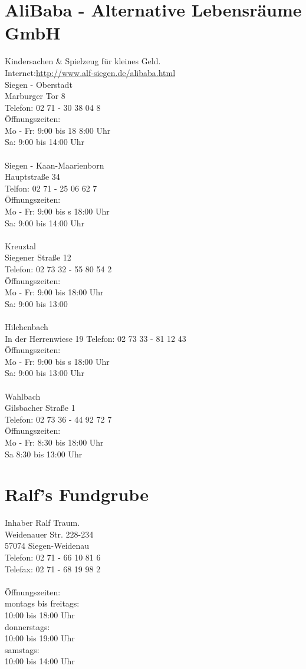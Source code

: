 \section{AliBaba - Alternative Lebensräume GmbH}
Kindersachen \& Spielzeug für kleines Geld.\\
Internet:\href{http://www.alf-siegen.de/alibaba.html}{http://www.alf-siegen.de/alibaba.html}
\\
Siegen - Oberstadt\\
Marburger Tor 8\\
Telefon: 02 71 - 30 38 04 8\\
Öffnungszeiten:\\
Mo - Fr: 9:00 bis 18 8:00 Uhr \\
Sa: 9:00 bis 14:00 Uhr\\ 
\\
Siegen - Kaan-Maarienborn\\
Hauptstraße 34\\
Telfon: 02 71 - 25 06 62 7\\ 
Öffnungszeiten:\\
Mo - Fr: 9:00 bis s 18:00 Uhr\\ 
Sa: 9:00 bis 14:00 Uhr\\
\\
Kreuztal \\ 
Siegener Straße 12\\  
Telefon: 02 73 32 - 55 80 54 2\\ 
Öffnungszeiten:\\
Mo - Fr: 9:00 bis 18:00 Uhr\\
Sa: 9:00 bis 13:00\\
\\
Hilchenbach\\
In der Herrenwiese 19 
Telefon: 02 73 33 - 81 12 43\\ 
Öffnungszeiten:\\
Mo - Fr: 9:00 bis s 18:00 Uhr\\
Sa: 9:00 bis 13:00 Uhr\\
\\
Wahlbach\\
Gilsbacher Straße 1\\  
Telefon: 02 73 36 - 44 92 72 7 \\
Öffnungszeiten: \\
Mo - Fr: 8:30 bis 18:00 Uhr \\
Sa 8:30 bis 13:00  Uhr \\

\section{Ralf's Fundgrube}
Inhaber Ralf Traum.\\
Weidenauer Str. 228-234\\
57074 Siegen-Weidenau\\
Telefon: 02 71 - 66 10 81 6\\
Telefax: 02 71 - 68 19 98 2\\
\\
Öffnungszeiten:\\
montags bis freitags:\\
10:00 bis 18:00 Uhr\\
donnerstags:\\
10:00 bis 19:00 Uhr\\
samstags:\\
10:00 bis 14:00 Uhr